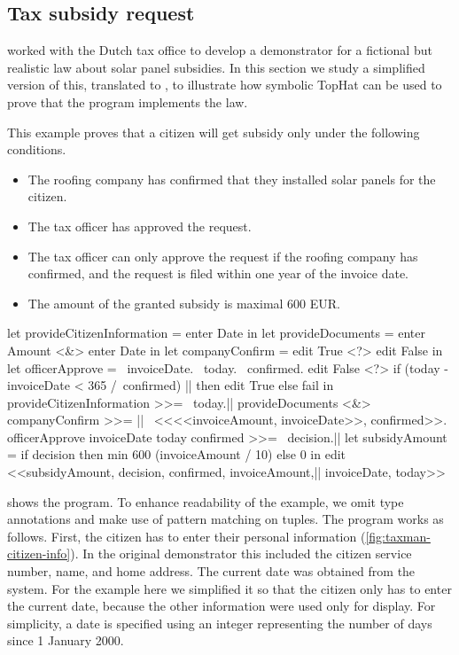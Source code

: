 \subsection{Tax subsidy request}

\citet{conf/sfp/StutterheimAP17} worked with the Dutch tax office to develop a demonstrator for a fictional but realistic law about solar panel subsidies.
In this section we study a simplified version of this, translated to \TOPHAT, to illustrate how symbolic TopHat can be used to prove that the program implements the law.

This example proves that a citizen will get subsidy only under the following conditions.
\begin{itemize}
\item The roofing company has confirmed that they installed solar panels for the citizen.
\item The tax officer has approved the request.
\item The tax officer can only approve the request if the roofing company has confirmed, and the request is filed within one year of the invoice date.
\item The amount of the granted subsidy is maximal 600 EUR.
\end{itemize}

\begin{TASK}[float=h
            ,numbers=right
            ,caption=Subsidy request and approval workflow at the Dutch tax office.
            ,label=fig:thetaxman
            ]
  let provideCitizenInformation = enter Date in
  let provideDocuments = enter Amount <&> enter Date in
  let companyConfirm = edit True <?> edit False in
  let officerApprove = \ invoiceDate. \ today. \ confirmed.
    edit False <?> if (today - invoiceDate < 365 /\ confirmed) |\label{fig:taxman-officer-approve-def}|
      then edit True else fail in
  provideCitizenInformation >>= \ today.|\label{fig:taxman-citizen-info}|
  provideDocuments <&> companyConfirm >>= |\label{fig:taxman-documents-and-company-confirm}|
    \ <<<<invoiceAmount, invoiceDate>>, confirmed>>.
  officerApprove invoiceDate today confirmed >>= \ decision.|\label{fig:taxman-officer-approve}|
  let subsidyAmount = if decision
    then min 600 (invoiceAmount / 10) else 0 in
  edit <<subsidyAmount, decision, confirmed, invoiceAmount,|\label{fig:taxman-result}|
    invoiceDate, today>>
\end{TASK}

 shows the program.
To enhance readability of the example,
we omit type annotations and make use of pattern matching on tuples.
The program works as follows.
First, the citizen has to enter their personal information (\cref{fig:taxman-citizen-info}).
In the original demonstrator this included the citizen service number, name, and home address.
The current date was obtained from the system.
For the example here we simplified it so that the citizen only has to enter the current date, because the other information were used only for display.
For simplicity, a date is specified using an integer representing the number of days since 1 January 2000.

